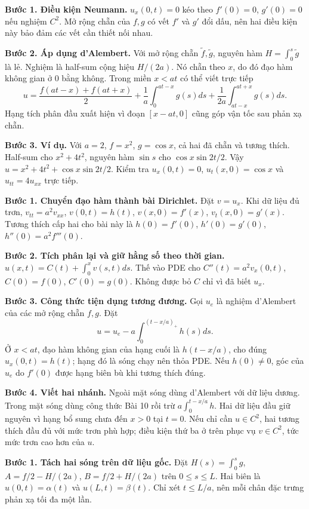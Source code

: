 \textbf{Bước 1. Điều kiện Neumann.} $u_x(0,t)=0$ kéo theo $f'(0)=0$, $g'(0)=0$ nếu nghiệm $C^2$. Mở rộng chẵn của $f,g$ có vết $f'$ và $g'$ đổi dấu, nên hai điều kiện này bảo đảm các vết cần thiết nối nhau.

\textbf{Bước 2. Áp dụng d'Alembert.} Với mở rộng chẵn $\widetilde f,\widetilde g$, nguyên hàm $H=\int_0^s\widetilde g$ là lẻ. Nghiệm là half-sum cộng hiệu $H/(2a)$. Nó chẵn theo $x$, do đó đạo hàm không gian ở $0$ bằng không. Trong miền $x<at$ có thể viết trực tiếp
\[u=\frac{f(at-x)+f(at+x)}2+\frac1a\int_0^{at-x}g(s)ds+\frac1{2a}\int_{at-x}^{at+x}g(s)ds.\]
Hạng tích phân đầu xuất hiện vì đoạn $[x-at,0]$ cũng góp vận tốc sau phản xạ chẵn.

\textbf{Bước 3. Ví dụ.} Với $a=2$, $f=x^2$, $g=\cos x$, cả hai đã chẵn và tương thích. Half-sum cho $x^2+4t^2$, nguyên hàm $\sin s$ cho $\cos x\sin2t/2$. Vậy $u=x^2+4t^2+\cos x\sin2t/2$. Kiểm tra $u_x(0,t)=0$, $u_t(x,0)=\cos x$ và $u_{tt}=4u_{xx}$ trực tiếp.

\textbf{Bước 1. Chuyển đạo hàm thành bài Dirichlet.} Đặt $v=u_x$. Khi dữ liệu đủ trơn, $v_{tt}=a^2v_{xx}$, $v(0,t)=h(t)$, $v(x,0)=f'(x)$, $v_t(x,0)=g'(x)$. Tương thích cấp hai cho bài này là $h(0)=f'(0)$, $h'(0)=g'(0)$, $h''(0)=a^2f'''(0)$.

\textbf{Bước 2. Tích phân lại và giữ hằng số theo thời gian.} $u(x,t)=C(t)+\int_0^xv(s,t)ds$. Thế vào PDE cho $C''(t)=a^2v_x(0,t)$, $C(0)=f(0)$, $C'(0)=g(0)$. Không được bỏ $C$ chỉ vì đã biết $u_x$.

\textbf{Bước 3. Công thức tiện dụng tương đương.} Gọi $u_e$ là nghiệm d'Alembert của các mở rộng chẵn $f,g$. Đặt
\[u=u_e-a\int_0^{(t-x/a)_+}h(s)ds.\]
Ở $x<at$, đạo hàm không gian của hạng cuối là $h(t-x/a)$, cho đúng $u_x(0,t)=h(t)$; hạng đó là sóng chạy nên thỏa PDE. Nếu $h(0)\ne0$, góc của $u_e$ do $f'(0)$ được hạng biên bù khi tương thích đúng.

\textbf{Bước 4. Viết hai nhánh.} Ngoài mặt sóng dùng d'Alembert với dữ liệu dương. Trong mặt sóng dùng công thức Bài 10 rồi trừ $a\int_0^{t-x/a}h$. Hai dữ liệu đầu giữ nguyên vì hạng bổ sung chưa đến $x>0$ tại $t=0$. Nếu chỉ cần $u\in C^2$, hai tương thích đầu đủ với mức trơn phù hợp; điều kiện thứ ba ở trên phục vụ $v\in C^2$, tức mức trơn cao hơn của $u$.

\textbf{Bước 1. Tách hai sóng trên dữ liệu gốc.} Đặt $H(s)=\int_0^sg$, $A=f/2-H/(2a)$, $B=f/2+H/(2a)$ trên $0\le s\le L$. Hai biên là $u(0,t)=\alpha(t)$ và $u(L,t)=\beta(t)$. Chỉ xét $t\le L/a$, nên mỗi chân đặc trưng phản xạ tối đa một lần.

